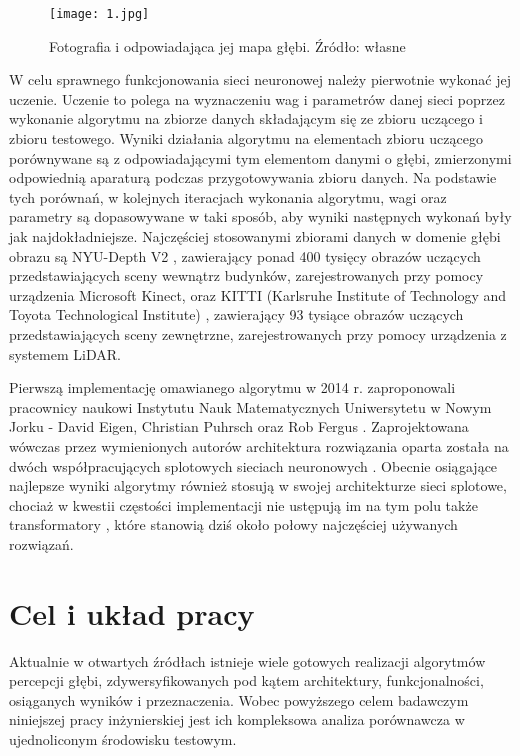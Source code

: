 \begin{figure}[H]
        \centering
        \texttt{[image: 1.jpg]}
        \caption{Fotografia i odpowiadająca jej mapa głębi. Źródło: własne}
        \label{fig:depthmap}
\end{figure}

W celu sprawnego funkcjonowania sieci neuronowej należy pierwotnie wykonać jej uczenie. Uczenie to polega na wyznaczeniu wag i parametrów danej sieci poprzez wykonanie algorytmu na zbiorze danych składającym się ze zbioru uczącego i zbioru testowego. Wyniki działania algorytmu na elementach zbioru uczącego porównywane są z odpowiadającymi tym elementom danymi o głębi, zmierzonymi odpowiednią aparaturą podczas przygotowywania zbioru danych. Na podstawie tych porównań, w kolejnych iteracjach wykonania algorytmu, wagi oraz parametry są dopasowywane w taki sposób, aby wyniki następnych wykonań były jak najdokładniejsze. Najczęściej stosowanymi zbiorami danych w domenie głębi obrazu są NYU-Depth V2 \cite{couprie2013}, zawierający ponad 400 tysięcy obrazów uczących przedstawiających sceny wewnątrz budynków, zarejestrowanych przy pomocy urządzenia Microsoft Kinect, oraz KITTI (Karlsruhe Institute of Technology and Toyota Technological Institute) \cite{geiger2012}, zawierający 93 tysiące obrazów uczących przedstawiających sceny zewnętrzne, zarejestrowanych przy pomocy urządzenia z systemem LiDAR.

Pierwszą implementację omawianego algorytmu w 2014 r. zaproponowali pracownicy naukowi Instytutu Nauk Matematycznych Uniwersytetu w Nowym Jorku - David Eigen, Christian Puhrsch oraz Rob Fergus \cite{eigen2014}. Zaprojektowana wówczas przez wymienionych autorów architektura rozwiązania oparta została na dwóch współpracujących splotowych sieciach neuronowych \cite{oshea2015}. Obecnie osiągające najlepsze wyniki algorytmy również stosują w swojej architekturze sieci splotowe, chociaż w kwestii częstości implementacji nie ustępują im na tym polu także transformatory \cite{vaswani2017}, które stanowią dziś około połowy najczęściej używanych rozwiązań.

\section{Cel i układ pracy}
Aktualnie w otwartych źródłach istnieje wiele gotowych realizacji algorytmów percepcji głębi, zdywersyfikowanych pod kątem architektury, funkcjonalności, osiąganych wyników i przeznaczenia. Wobec powyższego celem badawczym niniejszej pracy inżynierskiej jest ich kompleksowa analiza porównawcza w ujednoliconym środowisku testowym.

